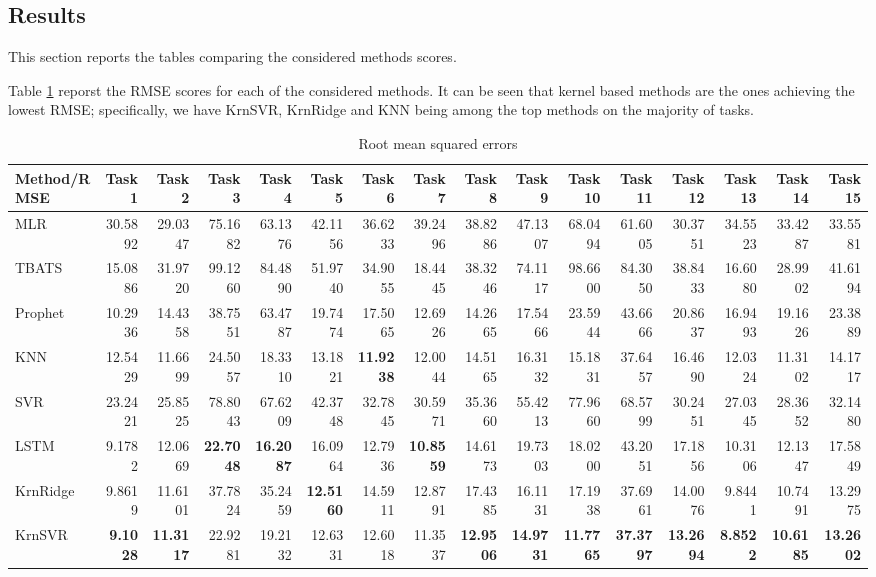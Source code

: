 \subsection{Results}
This section reports the tables comparing the considered methods scores.

Table \ref{tab:point_RMSE} reporst the RMSE scores for each of the considered methods. It can be seen that kernel based methods are the ones achieving the lowest RMSE; specifically, we have KrnSVR, KrnRidge and KNN being among the top methods on the majority of tasks.

\begin{table}[!ht]
    \caption{Root mean squared errors}
    \label{tab:point_RMSE}
    \begin{adjustbox}{width=\textwidth}
        \begin{tabular}{lrrrrrrrrrrrrrrr}
            \toprule
            Method/RMSE & Task 1 & Task 2 & Task 3 & Task 4 & Task 5 & Task 6 & Task 7 & Task 8 & Task 9 & Task 10 & Task 11 & Task 12 & Task 13 & Task 14 & Task 15 \\
            \midrule
            MLR & 30.5892 & 29.0347 & 75.1682 & 63.1376 & 42.1156 & 36.6233 & 39.2496 & 38.8286 & 47.1307 & 68.0494 & 61.6005 & 30.3751 & 34.5523 & 33.4287 & 33.5581 \\
            TBATS & 15.0886 & 31.9720 & 99.1260 & 84.4890 & 51.9740 & 34.9055 & 18.4445 & 38.3246 & 74.1117 & 98.6600 & 84.3050 & 38.8433 & 16.6080 & 28.9902 & 41.6194 \\
            Prophet & 10.2936 & 14.4358 & 38.7551 & 63.4787 & 19.7474 & 17.5065 & 12.6926 & 14.2665 & 17.5466 & 23.5944 & 43.6666 & 20.8637 & 16.9493 & 19.1626 & 23.3889 \\
            KNN & 12.5429 & 11.6699 & 24.5057 & 18.3310 & 13.1821 & \textbf{11.9238} & 12.0044 & 14.5165 & 16.3132 & 15.1831 & 37.6457 & 16.4690 & 12.0324 & 11.3102 & 14.1717 \\
            SVR & 23.2421 & 25.8525 & 78.8043 & 67.6209 & 42.3748 & 32.7845 & 30.5971 & 35.3660 & 55.4213 & 77.9660 & 68.5799 & 30.2451 & 27.0345 & 28.3652 & 32.1480 \\
            LSTM & 9.1782 & 12.0669 & \textbf{22.7048} & \textbf{16.2087} & 16.0964 & 12.7936 & \textbf{10.8559} & 14.6173 & 19.7303 & 18.0200 & 43.2051 & 17.1856 & 10.3106 & 12.1347 & 17.5849 \\
            KrnRidge & 9.8619 & 11.6101 & 37.7824 & 35.2459 & \textbf{12.5160} & 14.5911 & 12.8791 & 17.4385 & 16.1131 & 17.1938 & 37.6961 & 14.0076 & 9.8441 & 10.7491 & 13.2975 \\
            KrnSVR & \textbf{9.1028} & \textbf{11.3117} & 22.9281 & 19.2132 & 12.6331 & 12.6018 & 11.3537 & \textbf{12.9506} & \textbf{14.9731} & \textbf{11.7765} & \textbf{37.3797} & \textbf{13.2694} & 
            \textbf{8.8522} & \textbf{10.6185} & \textbf{13.2602} \\
            \bottomrule
            \end{tabular}            
    \end{adjustbox}
\end{table}


